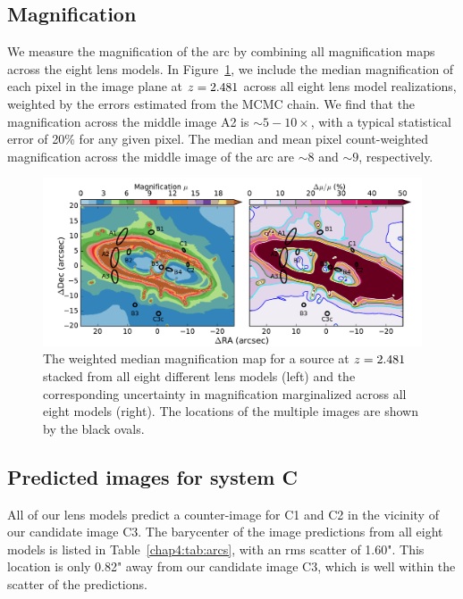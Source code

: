 \subsection{Magnification}
\label{chap4:subsec:magnification}

We measure the magnification of the arc by combining all magnification maps across the eight lens models. In Figure~\ref{chap4:fig:magmap}, we include the median magnification of each pixel in the image plane at $z=2.481$ across all eight lens model realizations, weighted by the errors estimated from the MCMC chain. We find that the magnification across the middle image A2 is $\sim5-10\times$, with a typical statistical error of 20\% for any given pixel. The median and mean pixel count-weighted magnification across the middle image of the arc are $\sim8$ and $\sim9$, respectively.

\begin{figure}
\includegraphics[width=\textwidth]{Chap4/c4f8.pdf}
\caption[Magnification map of \cluster]{The weighted median magnification map for a source at $z=2.481$ stacked from all eight different lens models (left) and the corresponding uncertainty in magnification marginalized across all eight models (right). The locations of the multiple images are shown by the black ovals.}
\label{chap4:fig:magmap}
\end{figure}

\subsection{Predicted images for system C}
All of our lens models predict a counter-image for C1 and C2 in the vicinity of our candidate image C3. The barycenter of the image predictions from all eight models is listed in Table~\ref{chap4:tab:arcs}, with an rms scatter of 1.60". This location is only 0.82" away from our candidate image C3, which is well within the scatter of the predictions.

